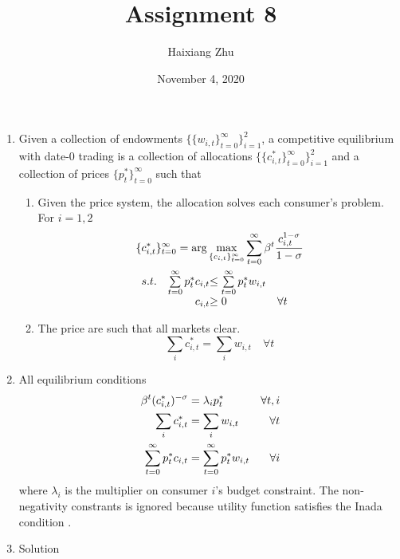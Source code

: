 \documentclass{article}
\title{Assignment 8}
\date{November 4, 2020}
\author{Haixiang Zhu}
\begin{document}
    \maketitle
    \renewcommand{\arraystretch}{1.5}
    \begin{enumerate}
        \item Given a collection of endowments $\{\{w_{i,t}\}_{t=0}^\infty\}_{i=1}^2$, a competitive equilibrium with date-0 trading is a collection of allocations $\{\{c_{i,t}^\ast\}_{t=0}^\infty\}_{i=1}^2$ and a collection of prices $\{p_{t}^\ast\}_{t=0}^\infty$ such that
        \begin{enumerate}
            \item Given the price system, the allocation solves each consumer's problem. For $i=1,2$ 
            \begin{align*}
                &\{c_{i,t}^\ast\}_{t=0}^\infty=\arg\max_{\{c_{i,t}\}_{t=0}^\infty}\sum_{t=0}^\infty\beta^t\frac{c_{i,t}^{1-\sigma}}{1-\sigma}\\
                &\begin{array}{r@{\quad}r@{}l@{\quad}l}
                s.t.&\sum\limits_{t=0}^\infty p_t^\ast c_{i,t}&\le\sum\limits_{t=0}^\infty p_t^\ast w_{i,t}\\
                &c_{i,t}&\ge0 &\forall t  
                \end{array} 
            \end{align*}
            \item The price are such that all markets clear. 
            \begin{equation*}
                \sum_i c_{i,t}^\ast=\sum_i w_{i,t}\quad\forall t 
            \end{equation*}
        \end{enumerate}
        \item All equilibrium conditions
        \begin{align}
            \beta^t (c_{i,t}^\ast)^{-\sigma}&=\lambda_ip_t^\ast&\forall t,i\label{c1}\\
            \sum_i c_{i,t}^\ast&=\sum_i w_{i,t}&\forall t\notag\\
            \sum_{t=0}^\infty p_t^\ast c_{i,t}&=\sum_{t=0}^\infty p_t^\ast w_{i,t}&\forall i\label{c2}
        \end{align}
        where $\lambda_i$ is the multiplier on consumer $i$'s budget constraint. The non-negativity constrants is ignored because utility function satisfies the Inada condition . 
        \item Solution\\

\end{enumerate}
\end{document}
